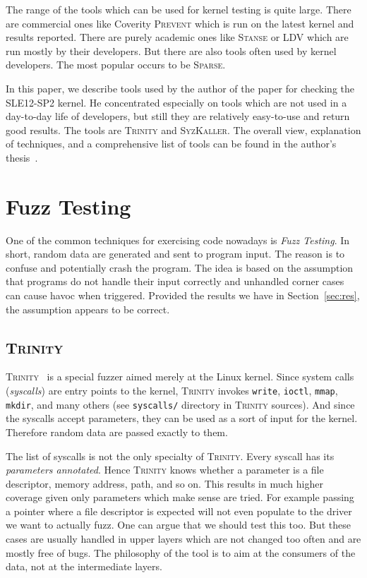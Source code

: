 \documentclass[10pt]{llncs}
\newcommand{\syz}{\textsc{SyzKaller}\xspace}
\newcommand{\trin}{\textsc{Trinity}\xspace}
\begin{document}
The range of the tools which can be used for kernel testing is quite large.
There are commercial ones like Coverity \textsc{Prevent} which is run on the
latest kernel and results reported. There are purely academic ones like
\textsc{Stanse} or \textsc{LDV} which are run mostly by their developers.
But there are also tools often used by kernel developers. The most popular
occurs to be \textsc{Sparse}.

In this paper, we describe tools used by the author of the paper for checking
the SLE12-SP2 kernel. He concentrated especially on tools which are not used
in a day-to-day life of developers, but still they are relatively easy-to-use
and return good results. The tools are \trin and \syz.  The overall view,
explanation of techniques, and a comprehensive list of tools can be found in the
author's thesis~\cite{slaby2013automatic}.

\section{Fuzz Testing} \label{sec:fuzz}
One of the common techniques for exercising code nowadays is \emph{Fuzz
Testing}. In short, random data are generated and sent to program input.  The
reason is to confuse and potentially crash the program. The idea is based on
the assumption that programs do not handle their input correctly and unhandled
corner cases can cause havoc when triggered. Provided the results we have in
Section~\ref{sec:res}, the assumption appears to be correct.

\subsection{\trin} \label{sec:trin}
\trin~\cite{trin} is a special fuzzer aimed merely at the Linux kernel.  Since
system calls (\textit{syscalls}) are entry points to the kernel, \trin invokes
\texttt{write}, \texttt{ioctl}, \texttt{mmap}, \texttt{mkdir}, and many others
(see \texttt{syscalls/} directory in \trin sources). And since the syscalls
accept parameters, they can be used as a sort of input for the kernel.
Therefore random data are passed exactly to them.

The list of syscalls is not the only specialty of \trin. Every syscall has
its \emph{parameters annotated}. Hence \trin knows whether a parameter is a
file descriptor, memory address, path, and so on. This results in much higher
coverage given only parameters which make sense are tried. For example passing
a pointer where a file descriptor is expected will not even populate to the
driver we want to actually fuzz. One can argue that we should test this too.
But these cases are usually handled in upper layers which are not changed too
often and are mostly free of bugs. The philosophy of the tool is to aim at the
consumers of the data, not at the intermediate layers.
\end{document}
